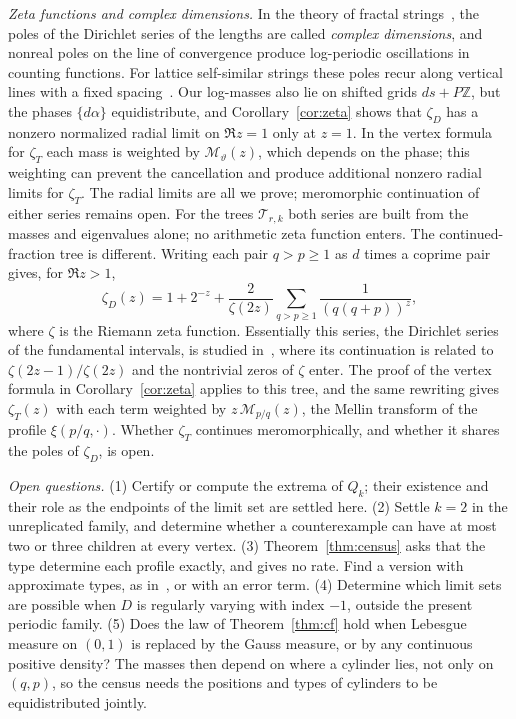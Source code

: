 \documentclass[11pt]{article}
\theoremstyle{definition}
\theoremstyle{remark}
\newcommand{\Z}{\mathbb Z}
\newcommand{\cyl}{\mathcal T}
\newcommand{\fr}[1]{\{#1\}}
\begin{document}
\emph{Zeta functions and complex dimensions.} In the theory of fractal
strings~\cite{LvF}, the poles of the Dirichlet series of the lengths are
called \emph{complex dimensions}, and nonreal poles on the line of
convergence produce log-periodic oscillations in counting functions. For
lattice self-similar strings these poles recur along vertical lines with
a fixed spacing~\cite[Chapters~2--3]{LvF}. Our log-masses also lie on
shifted grids $ds+P\Z$, but the phases $\fr{d\alpha}$ equidistribute,
and Corollary~\ref{cor:zeta} shows that $\zeta_D$ has a nonzero
normalized radial limit on $\Re z=1$ only at $z=1$.
In the vertex formula for $\zeta_T$ each
mass is weighted by $\mathcal M_\vartheta(z)$, which depends on the
phase; this weighting can prevent the cancellation and produce
additional nonzero radial limits for $\zeta_T$.
The radial limits are all we prove; meromorphic
continuation of either series remains open. For the trees
$\cyl_{r,k}$ both series are built from the masses and eigenvalues alone;
no arithmetic zeta function enters. The continued-fraction tree is
different. Writing each pair $q>p\ge1$ as $d$ times a coprime pair
gives, for $\Re z>1$,
\[
 \zeta_D(z)=1+2^{-z}+\frac2{\zeta(2z)}\sum_{q>p\ge1}\frac1{(q(q+p))^z},
\]
where $\zeta$ is the Riemann zeta function. Essentially this series, the
Dirichlet series of the fundamental intervals, is studied
in~\cite[Section~8.3]{CFV}, where its continuation is related to
$\zeta(2z-1)/\zeta(2z)$ and the nontrivial zeros of $\zeta$ enter. The
proof of the vertex formula in Corollary~\ref{cor:zeta} applies to this
tree, and the same rewriting gives $\zeta_T(z)$ with each term weighted
by $z\,\mathcal M_{p/q}(z)$, the Mellin transform of the profile
$\xi(p/q,\cdot)$. Whether $\zeta_T$ continues meromorphically, and whether
it shares the poles of $\zeta_D$, is open.

\emph{Open questions.} (1) Certify or compute the extrema of $Q_k$;
their existence and their role as the endpoints of the limit set are
settled here. (2) Settle $k=2$ in the unreplicated family, and determine
whether a counterexample can have at most two or three children at every
vertex. (3) Theorem~\ref{thm:census} asks that the type determine each
profile exactly, and gives no rate. Find a version with approximate
types, as in~\cite[Thm.~A.4]{K26}, or with an error term.
(4) Determine which limit sets are possible when $D$ is regularly
varying with index $-1$, outside the present periodic family.
(5) Does the law of Theorem~\ref{thm:cf} hold when Lebesgue measure on
$(0,1)$ is replaced by the Gauss measure, or by any continuous positive
density? The masses then depend on where
a cylinder lies, not only on $(q,p)$, so the census needs the positions
and types of cylinders to be equidistributed jointly.
\end{document}
